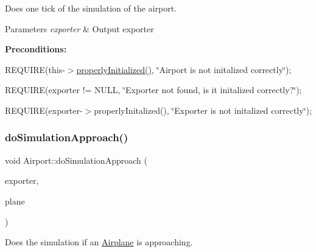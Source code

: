 Does one tick of the simulation of the airport. 


\begin{DoxyParams}{Parameters}
{\em exporter} & Output exporter\\
\hline
\end{DoxyParams}
{\bfseries Preconditions\+:}
\begin{DoxyItemize}
\item R\+E\+Q\+U\+I\+RE(this-\/$>$\mbox{\hyperlink{class_airport_aa13e68ac58e8875837fbe888325cfff6}{properly\+Initialized()}}, \char`\"{}\+Airport is not initalized correctly\char`\"{});
\item R\+E\+Q\+U\+I\+RE(exporter != N\+U\+LL, \char`\"{}\+Exporter not found, is it initalized correctly?\char`\"{});
\item R\+E\+Q\+U\+I\+RE(exporter-\/$>$properly\+Initalized(), \char`\"{}\+Exporter is not initalized correctly\char`\"{}); 
\end{DoxyItemize}\mbox{\label{class_airport_adb326706ff278a175efb9a55f31c4fa3}} 
\subsubsection{\texorpdfstring{do\+Simulation\+Approach()}{doSimulationApproach()}}
{\footnotesize\ttfamily void Airport\+::do\+Simulation\+Approach (\begin{DoxyParamCaption}\item[{\mbox{\hyperlink{class_airport_exporter}{Airport\+Exporter}} $\ast$}]{exporter,  }\item[{\mbox{\hyperlink{class_airplane}{Airplane}} $\ast$}]{plane }\end{DoxyParamCaption})}



Does the simulation if an \mbox{\hyperlink{class_airplane}{Airplane}} is approaching. 


